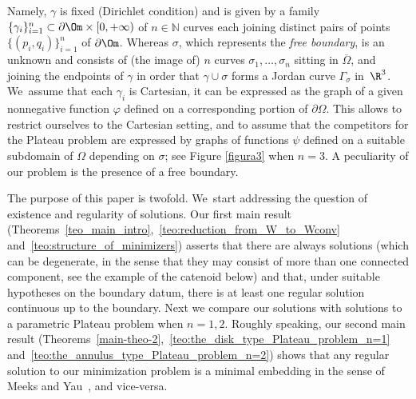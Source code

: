 Namely, $\gamma$ is fixed (Dirichlet condition) and
is given by a family
$\{\gamma_i\}_{i=1}^n\subset\partial \Om\times [0,+\infty)$
of $n\in\mathbb{N}$
curves
each joining distinct pairs of points $\{(p_i,q_i)\}_{i=1}^n$
of $\partial \Om$.
Whereas $\sigma$, which represents
the {\it free boundary}, is an unknown and
consists of (the image of)
$n$ curves $\sigma_1,\dots,\sigma_n$
sitting in $\overline\Omega$, and
joining the endpoints of $\gamma$
in order that $\gamma\cup\sigma$ forms a Jordan curve $\Gamma_\sigma$
in~$\R^3$. We~assume that each $\gamma_i$
is Cartesian, \ie it can be expressed as the graph of a given nonnegative function $\varphi$
defined on a corresponding portion of
$\partial \Omega$. This allows to restrict ourselves
to the Cartesian setting, and to assume that the competitors
for the Plateau problem are expressed by graphs of functions $\psi$
defined on a suitable subdomain of $\Omega$ depending on $\sigma$;
see Figure \ref{figura3} when $n=3$.
A peculiarity of our problem is the presence of a free boundary.

The purpose of this paper is twofold. We~start
addressing the question of existence and regularity of solutions.
Our first main result
(Theorems~\ref{teo_main_intro},~\ref{teo:reduction_from_W_to_Wconv} and~\ref{teo:structure_of_minimizers}) asserts that there are always solutions (which can be degenerate, in the sense that they may consist of more than one connected component,
see the example of the catenoid below) and that, under suitable hypotheses on the boundary datum, there is at least one regular solution continuous up to the boundary. Next we compare our solutions with solutions to a parametric Plateau problem when $n=1,2$.
Roughly speaking, our second main result (Theorems~\ref{main-theo-2},~\ref{teo:the_disk_type_Plateau_problem_n=1} and~\ref{teo:the_annulus_type_Plateau_problem_n=2}) shows that any regular solution to our minimization problem is a minimal embedding in the sense of Meeks and Yau~\cite{MY}, and vice-versa.

